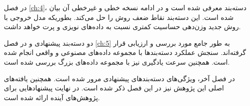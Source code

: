 در فصل \ref{ch:4}، دسته‌بند  معرفی شده است و در ادامه نسخه خطی و غیرخطی آن بیان شده است. این دسته‌بند نقاط ضعف روش  را حل می‌کند. بطوریکه مدل خروجی با روش جدید وزن‌دهی حساسیت کمتری نسبت به داده‌های نویزی و پرت خواهد داشت.

دو دسته‌بند پیشنهادی  و  در فصل \ref{ch:5} به طور جامع مورد بررسی و ارزیابی قرار گرفته‌اند.   سنجش عملکرد دسته‌بندها با مجموعه داده‌های مصنوعی و واقعی انجام شده است. همچنین سرعت یادگیری نیز با مجموعه داده‌های بزرگ بررسی شده است.

در فصل آخر، ویژگی‌های دسته‌بندهای پیشنهادی مرور شده است. همچنین یافته‌های اصلی این پژوهش نیز در این فصل ذکر شده است. در نهایت پیشنهادهایی برای پژوهش‌های آینده ارائه شده است. 
\newpage

